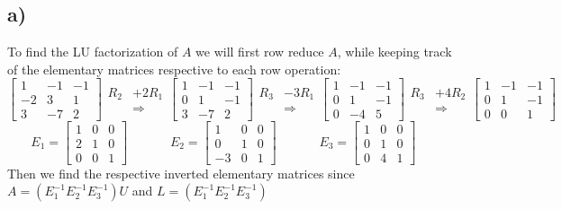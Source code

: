 \documentclass{article}
\begin{document}
\subsection*{a)}
To find the LU factorization of $A$ we will first row reduce $A$, while keeping track of the elementary matrices respective to each row operation:$$\begin{bmatrix}
    1&-1&-1\\
    -2&3&1\\
    3&-7&2
\end{bmatrix}\begin{aligned}
    R_2&+2R_1\\
    &\Rightarrow
\end{aligned}\begin{bmatrix}
    1&-1&-1\\
    0&1&-1\\
    3&-7&2
\end{bmatrix}\begin{aligned}
    R_3&-3R_1\\
    &\Rightarrow
\end{aligned}\begin{bmatrix}
    1&-1&-1\\
    0&1&-1\\
    0&-4&5
\end{bmatrix}\begin{aligned}
    R_3&+4R_2\\
    &\Rightarrow
\end{aligned}\begin{bmatrix}
    1&-1&-1\\
    0&1&-1\\
    0&0&1
\end{bmatrix}$$
$$E_1=\begin{bmatrix}
    1 & 0 & 0\\
    2 & 1 & 0\\
    0 & 0 & 1
\end{bmatrix}\;\;\;\;\;\;\;\;\;\;\;\;
E_2=\begin{bmatrix}
    1 & 0 & 0\\
    0 & 1 & 0\\
    -3 & 0 & 1
\end{bmatrix}\;\;\;\;\;\;\;\;\;\;\;\;
E_3=\begin{bmatrix}
    1 & 0 & 0\\
    0 & 1 & 0\\
    0 & 4 & 1
\end{bmatrix}\;\;\;\;\;\;$$
Then we find the respective inverted elementary matrices since $A=(E_1^{-1}E_2^{-1}E_3^{-1})U$ and $L=(E_1^{-1}E_2^{-1}E_3^{-1})$
\end{document}
